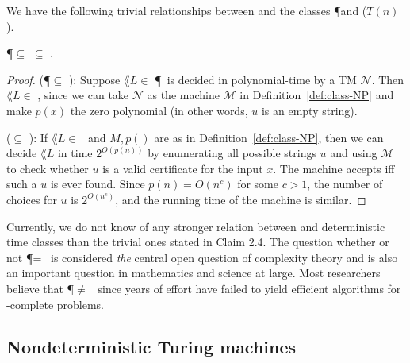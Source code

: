 We have the following trivial relationships between \NP and the classes \P and \DTIME($T(n)$).

\begin{theorem}
	\P $\subseteq$ \NP $\subseteq$ \EXP.
\end{theorem}

\begin{proof}
	(\P $\subseteq$ \NP): Suppose $\lang{L} \in$ \P~is decided in polynomial-time by a TM $\mathcal{N}$. Then $\lang{L} \in$ \NP, since we can take $\mathcal{N}$ as the machine $\mathcal{M}$ in Definition~\ref{def:class-NP} and make $p(x)$ the zero polynomial (in other words, $u$ is an empty string).

	(\NP $\subseteq$ \EXP): If $\lang{L} \in$ \NP~and $M,p()$ are as in Definition~\ref{def:class-NP}, then we can decide $\lang{L}$ in time $2^{O(p(n))}$ by enumerating all possible strings $u$ and using $\mathcal{M}$ to check whether $u$ is a valid certificate for the input $x$. The machine accepts iff such a $u$ is ever found. Since $p(n) = O(n^c)$ for some $c > 1$, the number of choices for $u$ is $2^{O(n^c)}$, and the running time of the machine is similar.
\end{proof}

Currently, we do not know of any stronger relation between \NP and deterministic time classes than the trivial ones stated in Claim 2.4. The question whether or not \P = \NP~is considered \emph{the} central open question of complexity theory and is also an important question in mathematics and science at large.
Most researchers believe that \P $\neq$ \NP~since years of effort have failed to yield efficient algorithms for \NP-complete problems.

\subsection{Nondeterministic Turing machines}

